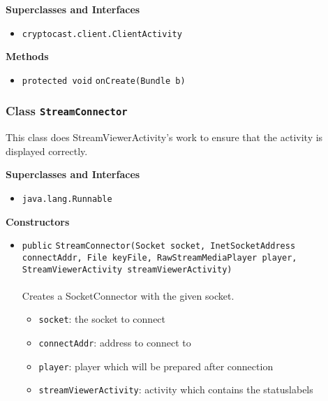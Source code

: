 \textbf{\sffamily Superclasses and Interfaces}
\begin{itemize}
\item \lstinline|cryptocast.client.ClientActivity|
\end{itemize}



\textbf{\sffamily Methods}
\begin{itemize}
\item \lstinline|protected void| \lstinline|onCreate|\lstinline|(Bundle b)| \\[-0.6em]




\end{itemize}

\subsubsection{Class \lstinline|StreamConnector|}
This class does StreamViewerActivity's work to ensure that the activity is displayed
 correctly. \\
\noindent\begin{minipage}[t]{5cm}
\vspace{0.3em}
\hspace*{2em}
\vspace{0.3em}
\end{minipage}



\textbf{\sffamily Superclasses and Interfaces}
\begin{itemize}
\item \lstinline|java.lang.Runnable|
\end{itemize}


\textbf{\sffamily Constructors}
\begin{itemize}
\item \lstinline|public| \lstinline|StreamConnector|\lstinline|(Socket socket, InetSocketAddress connectAddr, File keyFile, RawStreamMediaPlayer player, StreamViewerActivity streamViewerActivity)|\\ \\[-0.6em]
Creates a SocketConnector with the given socket.
\begin{itemize}
\item \lstinline|socket|: the socket to connect
\item \lstinline|connectAddr|: address to connect to
\item \lstinline|player|: player which will be prepared after connection
\item \lstinline|streamViewerActivity|: activity which contains the statuslabels
\end{itemize}



\end{itemize}


